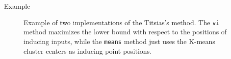 \begin{frame}{Example}
	\begin{figure}[!h]
		\centering
		\subfloat{
			\scalebox{0.5}{
				
			}
		}
		\subfloat{
			\scalebox{0.5}{
				
			}
		}
		\caption{Example of two implementations of the Titsias's method. The \lstinline{vi} method maximizes the lower bound with respect to the positions of inducing inputs, while the \lstinline{means} method just uses the K-means cluster centers as inducing point positions.}
	\end{figure}
\end{frame}